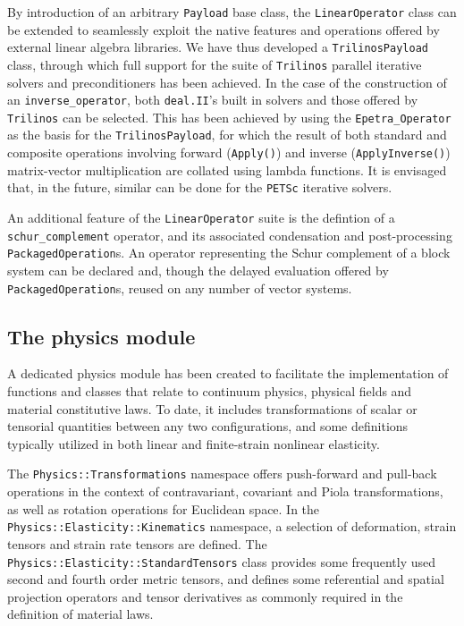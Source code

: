 \documentclass{ansarticle-preprint}
\newcommand{\specialword}[1]{\texttt{#1}}
\newcommand{\dealii}{{\specialword{deal.II}}}
\newcommand{\trilinos}{{\specialword{Trilinos}}}
\newcommand{\petsc}{\specialword{PETSc}}
\begin{document}
By introduction of an arbitrary \texttt{Payload} base class, the \texttt{LinearOperator} class can be extended to seamlessly exploit the native features and operations offered by external linear algebra libraries.
We have thus developed a \texttt{TrilinosPayload} class, through which full support for the suite of {\trilinos} parallel iterative solvers and preconditioners has been achieved.
In the case of the construction of an \texttt{inverse\_operator}, both \dealii's built in solvers and those offered by {\trilinos} can be selected.
This has been achieved by using the \texttt{Epetra\_Operator} as the basis for the \texttt{TrilinosPayload}, for which the result of both standard and composite operations involving forward (\texttt{Apply()}) and inverse (\texttt{ApplyInverse()}) matrix-vector multiplication are collated using lambda functions.
It is envisaged that, in the future, similar can be done for the {\petsc} iterative solvers.

An additional feature of the \texttt{LinearOperator} suite is the defintion of a \texttt{schur\_complement} operator, and its associated condensation and post-processing \texttt{PackagedOperation}s.
An operator representing the Schur complement of a block system can be declared and, though the delayed evaluation offered by \texttt{PackagedOperation}s, reused on any number of vector systems.

\subsection{The physics module}

A dedicated physics module has been created to facilitate the implementation of functions and classes that relate to continuum physics, physical fields and material constitutive laws.
To date, it includes transformations of scalar or tensorial quantities between any two configurations, and some definitions typically utilized in both linear and finite-strain nonlinear elasticity.

The \verb!Physics::Transformations! namespace offers push-forward and pull-back operations in the context of contravariant, covariant and Piola transformations, as well as rotation operations for Euclidean space.
In the \verb!Physics::Elasticity::Kinematics! namespace, a selection of deformation, strain tensors and strain rate tensors are defined.
The \verb!Physics::Elasticity::StandardTensors! class provides some frequently used second and fourth order metric tensors, and defines some referential and spatial projection operators and tensor derivatives as commonly required in the definition of material laws.
\end{document}
